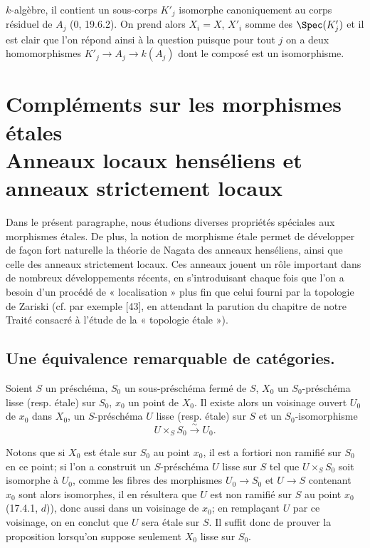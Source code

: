 
$k$-algèbre, il contient un sous-corps $K'_j$ isomorphe canoniquement au corps résiduel de $A_j$ (0, 19.6.2). On prend alors $X_i=X$, $X'_i$ somme des $\Spec(K'_j)$ et il est clair que l'on répond ainsi à la question puisque pour tout $j$ on a deux homomorphismes $K'_j\to A_j\to k(A_j)$ dont le composé est un isomorphisme.

\section[Compléments sur les morphismes étales. Anneaux locaux henséliens et anneaux strictement locaux]{Compléments sur les morphismes étales\\Anneaux locaux henséliens et anneaux strictement locaux}
\label{section:IV.18}

Dans le présent paragraphe, nous étudions diverses propriétés spéciales aux morphismes étales. De plus, la notion de morphisme étale permet de développer de façon fort naturelle la théorie de Nagata des anneaux henséliens, ainsi que celle des anneaux strictement locaux. Ces anneaux jouent un rôle important dans de nombreux développements récents, en s'introduisant chaque fois que l'on a besoin d'un procédé de « localisation » plus fin que celui fourni par la topologie de Zariski (cf. par exemple [43], en attendant la parution du chapitre de notre Traité consacré à l'étude de la « topologie étale »).

\subsection{Une équivalence remarquable de catégories.}

\begin{proposition}[18.1.1]
\label{IV.18.1.1}
Soient $S$ un préschéma, $S_0$ un sous-préschéma fermé de $S$, $X_0$ un $S_0$-préschéma lisse (resp. étale) sur $S_0$, $x_0$ un point de $X_0$. Il existe alors un voisinage ouvert $U_0$ de $x_0$ dans $X_0$, un $S$-préschéma $U$ lisse (resp. étale) sur $S$ et un $S_0$-isomorphisme
\[
  U\times_S S_0\xrightarrow{\sim}U_0.
\]
\end{proposition}

Notons que si $X_0$ est étale sur $S_0$ au point $x_0$, il est a fortiori non ramifié sur $S_0$ en ce point; si l'on a construit un $S$-préschéma $U$ lisse sur $S$ tel que $U\times_S S_0$ soit isomorphe à $U_0$, comme les fibres des morphismes $U_0\to S_0$ et $U\to S$ contenant $x_0$ sont alors isomorphes, il en résultera que $U$ est non ramifié sur $S$ au point $x_0$ (17.4.1, $d$)), donc aussi dans un voisinage de $x_0$; en remplaçant $U$ par ce voisinage, on en conclut que $U$ sera étale sur $S$. Il suffit donc de prouver la proposition lorsqu'on suppose seulement $X_0$ lisse sur $S_0$.

